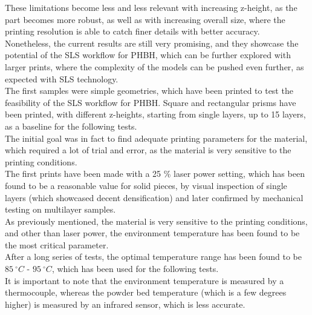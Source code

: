 \documentclass[a4paper]{article}
\begin{document}
          These limitations become less and less relevant with increasing z-height, as the part becomes 
          more robust, as well as with increasing overall size, where the printing resolution 
          is able to catch finer details with better accuracy. \\
  
          Nonetheless, the current results are still very promising, and they showcase the potential of the SLS workflow
          for PHBH, which can be further explored with larger prints, where the complexity of the models 
          can be pushed even further, as expected with SLS technology. \\  
  
          The first samples were simple geometries, which have been printed to test the feasibility of the SLS workflow 
          for PHBH. Square and rectangular prisms have been printed, with different z-heights, starting from single 
          layers, up to 15 layers, as a baseline for the following tests. \\ 
  
          The initial goal was in fact to find adequate printing parameters for the material, which required a lot 
          of trial and error, as the material is very sensitive to the printing conditions. \\
  
          The first prints have been made with a 25 \%  laser power setting, which has been found to be 
          a reasonable value for solid pieces, by visual inspection of single layers (which showcased 
          decent densification) and later confirmed by 
          mechanical testing on multilayer samples. \\ 
          
          As previously mentioned, the material is very sensitive to the printing conditions, and other than laser power,
          the environment temperature has been found to be the most critical parameter. \\ 
  
          After a long series of tests, the optimal temperature range has been found to be $85 \ ^{\circ}C$ - $95 \ ^{\circ}C$, which has been
          used for the following tests. \\ 
  
          It is important to note that the environment temperature is measured by a thermocouple, whereas the 
          powder bed temperature (which is a few degrees higher) is measured by an infrared sensor, which  
          is less accurate. 
  
\end{document}
